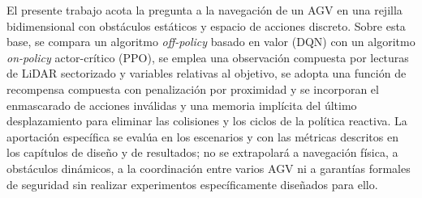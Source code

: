El presente trabajo acota la pregunta a la navegación de un AGV en una
rejilla bidimensional con obstáculos estáticos y espacio de acciones
discreto. Sobre esta base, se compara un algoritmo \textit{off-policy}
basado en valor (DQN) con un algoritmo \textit{on-policy} actor-crítico
(PPO), se emplea una observación compuesta por lecturas de LiDAR
sectorizado y variables relativas al objetivo, se adopta una función de
recompensa compuesta con penalización por proximidad y se incorporan el
enmascarado de acciones inválidas y una memoria implícita del último
desplazamiento para eliminar las colisiones y los ciclos de la política
reactiva. La aportación específica se evalúa en los
escenarios y con las métricas descritos en los capítulos de diseño y de
resultados; no se extrapolará a navegación física, a obstáculos dinámicos,
a la coordinación entre varios AGV ni a garantías formales de seguridad
sin realizar experimentos específicamente diseñados para ello.
